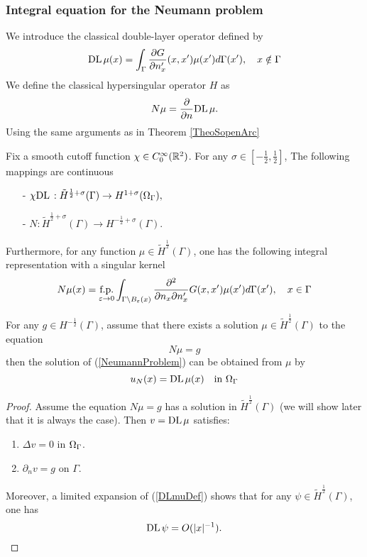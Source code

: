\documentclass[10pt,a4paper]{article}
\begin{document}
\subsubsection*{Integral equation for the Neumann problem}
We introduce the classical double-layer operator defined by 
\begin{equation}
	\textup{DL}\hspace{1.5pt} \mu (x) = \int_{\Gamma} \frac{\partial G}{\partial n_x'}(x,x') \mu(x') d\Gamma(x'), \quad x\notin \Gamma
	\label{DLmuDef}
\end{equation}
We define the classical hypersingular operator $H$ as 
\[N \mu = \frac{\partial}{\partial n} \textup{DL}\hspace{1.5pt} \mu.\]
Using the same arguments as in Theorem \ref{TheoSopenArc}
\begin{The} Fix a smooth cutoff function $\chi \in C^{\infty}_{0}(\mathbb{R}^2)$. For any $\sigma \in [-\frac{1}{2}, \frac{1}{2}]$, The following mappings are continuous
	\begin{enumerate}
		\item[-] $\chi\mathcal {\textup{DL}\hspace{1.5pt}} : \tilde{H}^{\frac{1}{2} + \sigma}(\Gamma) \to H^{1+ \sigma}(\Omega_\Gamma),$
		\item[-] $N : \tilde{H}^{\frac{1}{2} + \sigma}(\Gamma) \to H^{-\frac{1}{2}+ \sigma}(\Gamma).$
	\end{enumerate}
	Furthermore, for any function $\mu \in \tilde{H}^{\frac{1}{2}}(\Gamma)$, one has the following integral representation with a singular kernel
	\begin{equation}
	N\mu(x) = \underset{\varepsilon \to 0}{\textup{f.p.}} \int_{\Gamma \setminus B_\varepsilon(x)} \frac{\partial ^2}{\partial n_x \partial n_x'} G(x,x') \mu(x')d\Gamma(x'), \quad x \in \Gamma
	\label{NDef}
	\end{equation}
\end{The}
\begin{The}
	For any $g \in H^{-\frac{1}{2}}(\Gamma)$, assume that there exists a solution $\mu \in \tilde{H}^{\frac{1}{2}}(\Gamma)$ to the equation
	\begin{equation}
		N \mu = g
	\end{equation}
	then the solution of (\ref{NeumannProblem}) can be obtained from $\mu$ by
	\[ u_N(x) = \textup{DL}\hspace{1.5pt} \mu (x) \quad \text{in } \Omega_\Gamma\]
	\begin{proof}
		Assume the equation $N\mu = g$ has a solution in $\tilde{H}^{\frac{1}{2}}(\Gamma)$ (we will show later that it is always the case). Then $v= \textup{DL}\hspace{1.5pt} \mu$ satisfies: 
		\begin{enumerate}
			\item $\Delta v = 0$ in $\Omega_\Gamma$. 
			\item $\partial_n v = g$ on $\Gamma$.  
		\end{enumerate}
		Moreover, a limited expansion of (\ref{DLmuDef}) shows that for any $\psi \in \tilde{H}^{\frac{1}{2}}(\Gamma)$, one has
		\[\textup{DL}\hspace{1.5pt} \psi = O(|x|^{-1}).\]
	\end{proof}
\end{The}
\end{document}

